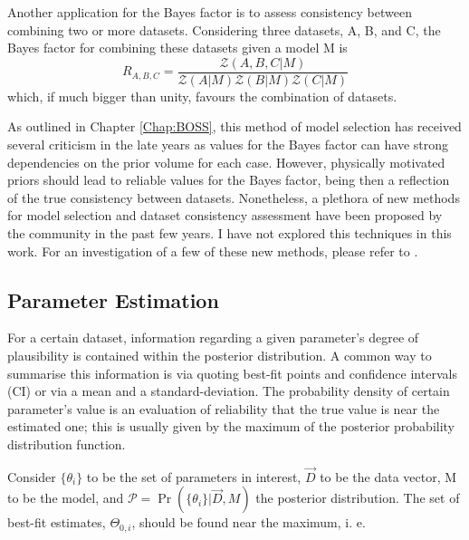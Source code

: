 \qquad Another application for the Bayes factor is to assess consistency between combining two or more datasets. Considering three datasets, A, B, and C, the Bayes factor for combining these datasets given a model M is
\begin{equation}
R_{A,B,C} = \frac{\mathcal{Z}(A,B,C|M)}{\mathcal{Z}(A|M)\mathcal{Z}(B|M)\mathcal{Z}(C|M)}
\label{Eq:Intro:BayesFactor2}
\end{equation}
which, if much bigger than unity, favours the combination of datasets. 

\qquad As outlined in Chapter \ref{Chap:BOSS}, this method of model selection has received several criticism in the late years as values for the Bayes factor can have strong dependencies on the prior volume for each case. However, physically motivated priors should lead to reliable values for the Bayes factor, being then a reflection of the true consistency between datasets. Nonetheless, a plethora of new methods for model selection and dataset consistency assessment have been proposed by the community in the past few years. I have not explored this techniques in this work. For an investigation of a few of these new methods, please refer to \cite{2017CharnockTension,2018HuTension,2018FeeneyTension}.

\subsection{Parameter Estimation}\label{Sec:ParamEstSampling}
For a certain dataset, information regarding a given parameter's degree of plausibility is contained within the posterior distribution. A common way to summarise this information is via quoting best-fit points and confidence intervals (CI) or via a mean and a standard-deviation. The probability density of certain parameter's value is an evaluation of reliability that the true value is near the estimated one; this is usually given by the maximum of the posterior probability distribution function.

\qquad Consider $\{\theta_i\}$ to be the set of parameters in interest, $\vec{D}$ to be the data vector, M to be the model, and $\mathcal{P} = \Pr(\{\theta_i\}|\vec{D}, M)$ the posterior distribution. The set of best-fit estimates, $\Theta_{0,i}$, should be found near the maximum, i. e.

